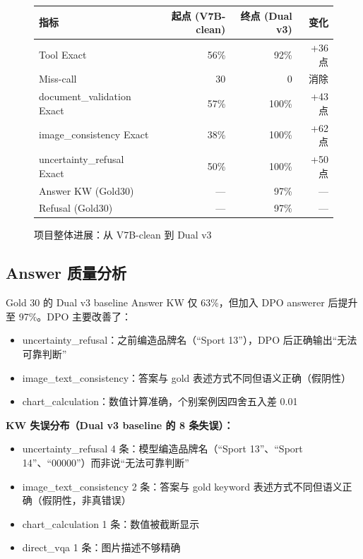 \documentclass[12pt,a4paper]{ctexart}
\begin{document}
\begin{figure}[H]
\centering
\begin{tabular}{lrrr}
\toprule
指标 & 起点 (V7B-clean) & 终点 (Dual v3) & 变化 \\
\midrule
Tool Exact & 56\% & 92\% & +36 点 \\
Miss-call & 30 & 0 & 消除 \\
document\_validation Exact & 57\% & 100\% & +43 点 \\
image\_consistency Exact & 38\% & 100\% & +62 点 \\
uncertainty\_refusal Exact & 50\% & 100\% & +50 点 \\
Answer KW (Gold30) & — & 97\% & — \\
Refusal (Gold30) & — & 97\% & — \\
\bottomrule
\end{tabular}
\caption{项目整体进展：从 V7B-clean 到 Dual v3}
\end{figure}

\subsection{Answer 质量分析}

Gold 30 的 Dual v3 baseline Answer KW 仅 63\%，但加入 DPO answerer 后提升至 97\%。DPO 主要改善了：

\begin{itemize}[nosep]
  \item uncertainty\_refusal：之前编造品牌名（``Sport 13''），DPO 后正确输出``无法可靠判断''
  \item image\_text\_consistency：答案与 gold 表述方式不同但语义正确（假阴性）
  \item chart\_calculation：数值计算准确，个别案例因四舍五入差 0.01
\end{itemize}

\textbf{KW 失误分布（Dual v3 baseline 的 8 条失误）：}

\begin{itemize}[nosep]
  \item uncertainty\_refusal 4 条：模型编造品牌名（``Sport 13''、``Sport 14''、``00000''）而非说``无法可靠判断''
  \item image\_text\_consistency 2 条：答案与 gold keyword 表述方式不同但语义正确（假阴性，非真错误）
  \item chart\_calculation 1 条：数值被截断显示
  \item direct\_vqa 1 条：图片描述不够精确
\end{itemize}
\end{document}
